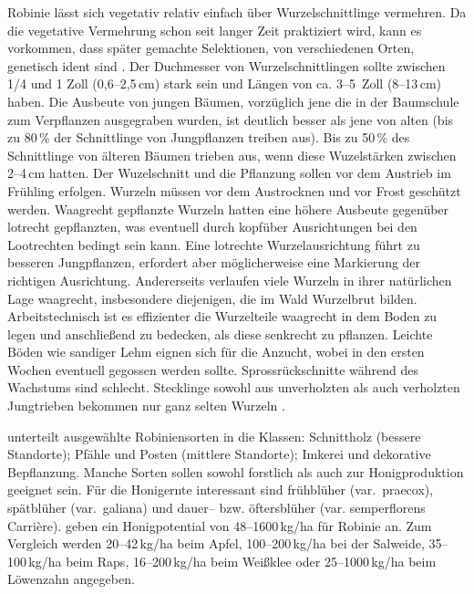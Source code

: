 \documentclass[twocolumn]{scrartcl}
\begin{document}
Robinie lässt sich vegetativ relativ einfach über Wurzelschnittlinge
vermehren. Da die vegetative Vermehrung schon seit langer Zeit
praktiziert wird, kann es vorkommen, dass später gemachte Selektionen,
von verschiedenen Orten, genetisch ident sind
\citep{liesebach2012robinie}. Der Duchmesser von Wurzelschnittlingen
sollte zwischen 1/4 und 1 Zoll (0,6--2,5\,cm) stark sein und Längen
von ca. 3--5~Zoll (8--13\,cm) haben. Die Ausbeute von jungen Bäumen,
vorzüglich jene die in der Baumschule zum Verpflanzen ausgegraben
wurden, ist deutlich besser als jene von alten (bis zu 80\,\% der
Schnittlinge von Jungpflanzen treiben aus).  Bis zu 50\,\% des
Schnittlinge von älteren Bäumen trieben aus, wenn diese Wuzelstärken
zwischen 2--4\,cm hatten.  Der Wuzelschnitt und die Pflanzung sollen
vor dem Austrieb im Frühling erfolgen. Wurzeln müssen vor dem
Austrocknen und vor Frost geschützt werden. Waagrecht gepflanzte
Wurzeln hatten eine höhere Ausbeute gegenüber lotrecht gepflanzten,
was eventuell durch kopfüber Ausrichtungen bei den Lootrechten bedingt
sein kann. Eine lotrechte Wurzelausrichtung führt zu besseren
Jungpflanzen, erfordert aber möglicherweise eine Markierung der
richtigen Ausrichtung. Andererseits verlaufen viele Wurzeln in ihrer
natürlichen Lage waagrecht, insbesondere diejenigen, die im Wald
Wurzelbrut bilden.  Arbeitstechnisch ist es effizienter die
Wurzelteile waagrecht in dem Boden zu legen und anschließend zu
bedecken, als diese senkrecht zu pflanzen.  Leichte Böden wie sandiger
Lehm eignen sich für die Anzucht, wobei in den ersten Wochen eventuell
gegossen werden sollte. Sprossrückschnitte während des Wachstums sind
schlecht. Stecklinge sowohl aus unverholzten als auch verholzten
Jungtrieben bekommen nur ganz selten Wurzeln
\citep{swingle1937robinie}.

\citet{keresztesi1983robinie} unterteilt ausgewählte Robiniensorten in
die Klassen: Schnittholz (bessere Standorte); Pfähle und Posten
(mittlere Standorte); Imkerei und dekorative Bepflanzung. Manche
Sorten sollen sowohl forstlich als auch zur Honigproduktion geeignet
sein. Für die Honigernte interessant sind frühblüher (var.\ praecox),
spätblüher (var.\ galiana) und dauer-- bzw. öftersblüher
(var. semperflorens Carrière). \citet[S.~80]{crane1985honig} geben ein
Honigpotential von 48--1600\,kg/ha für Robinie an. Zum Vergleich werden
20--42\,kg/ha beim Apfel, 100--200\,kg/ha bei der Salweide,
35--100\,kg/ha beim Raps, 16--200\,kg/ha beim Weißklee oder
25--1000\,kg/ha beim Löwenzahn angegeben.
\end{document}

